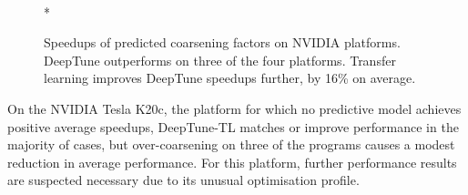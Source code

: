 \begin{figure}
  \centering %
  \\*
  \caption[Speedups of predicted thread coarsening factors on NVIDIA]{%
    Speedups of predicted coarsening factors on NVIDIA platforms. DeepTune outperforms \citeauthor{Magni2014} on three of the four platforms. Transfer learning improves DeepTune speedups further, by 16\% on average.%
  }%
  \label{fig:pact-speedup-right}
\end{figure}

On the NVIDIA Tesla K20c, the platform for which no predictive model achieves positive average speedups, DeepTune-TL matches or improve performance in the majority of cases, but over-coarsening on three of the programs causes a modest reduction in average performance. For this platform, further performance results are suspected necessary due to its unusual optimisation profile.
